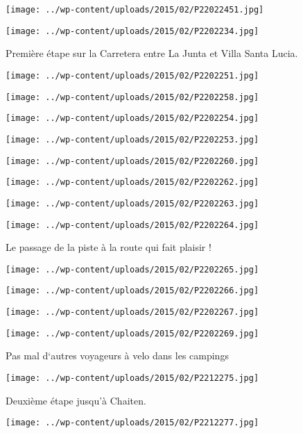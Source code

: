\newline
\centerline{\texttt{[image: ../wp-content/uploads/2015/02/P22022451.jpg]} } 
 \newline
\centerline{\texttt{[image: ../wp-content/uploads/2015/02/P2202234.jpg]} } 
Première étape sur la Carretera entre La Junta et Villa Santa Lucia. \newline
 \newline
\centerline{\texttt{[image: ../wp-content/uploads/2015/02/P2202251.jpg]} } 
\newline
\centerline{\texttt{[image: ../wp-content/uploads/2015/02/P2202258.jpg]} } 
\newline
\centerline{\texttt{[image: ../wp-content/uploads/2015/02/P2202254.jpg]} } 
 \newline
\centerline{\texttt{[image: ../wp-content/uploads/2015/02/P2202253.jpg]} } 
 \newline
\centerline{\texttt{[image: ../wp-content/uploads/2015/02/P2202260.jpg]} } 
 \newline
\centerline{\texttt{[image: ../wp-content/uploads/2015/02/P2202262.jpg]} } 
 \newline
\centerline{\texttt{[image: ../wp-content/uploads/2015/02/P2202263.jpg]} } 
 \newline
\centerline{\texttt{[image: ../wp-content/uploads/2015/02/P2202264.jpg]} } 
Le passage de la piste à la route qui fait plaisir ! \newline
 \newline
\centerline{\texttt{[image: ../wp-content/uploads/2015/02/P2202265.jpg]} } 
\newline
\centerline{\texttt{[image: ../wp-content/uploads/2015/02/P2202266.jpg]} } 
 \newline
\centerline{\texttt{[image: ../wp-content/uploads/2015/02/P2202267.jpg]} } 
 \newline
\centerline{\texttt{[image: ../wp-content/uploads/2015/02/P2202269.jpg]} } 
Pas mal d`autres voyageurs à velo dans les campings \newline
 \newline
\centerline{\texttt{[image: ../wp-content/uploads/2015/02/P2212275.jpg]} } 
Deuxième étape jusqu'à Chaiten. \newline
 \newline
\centerline{\texttt{[image: ../wp-content/uploads/2015/02/P2212277.jpg]} } 
